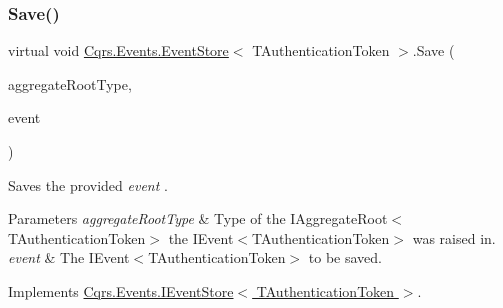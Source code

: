 \mbox{\label{classCqrs_1_1Events_1_1EventStore_a3ba5ba04a36382b6d36a6ad8867dc766_a3ba5ba04a36382b6d36a6ad8867dc766}} 
\subsubsection{\texorpdfstring{Save()}{Save()}}
{\footnotesize\ttfamily virtual void \hyperlink{classCqrs_1_1Events_1_1EventStore}{Cqrs.\+Events.\+Event\+Store}$<$ T\+Authentication\+Token $>$.Save (\begin{DoxyParamCaption}\item[{Type}]{aggregate\+Root\+Type,  }\item[{\hyperlink{interfaceCqrs_1_1Events_1_1IEvent}{I\+Event}$<$ T\+Authentication\+Token $>$ @}]{event }\end{DoxyParamCaption})\hspace{0.3cm}{\ttfamily [virtual]}}



Saves the provided {\itshape event} . 


\begin{DoxyParams}{Parameters}
{\em aggregate\+Root\+Type} & Type of the I\+Aggregate\+Root$<$\+T\+Authentication\+Token$>$ the I\+Event$<$\+T\+Authentication\+Token$>$ was raised in.\\
\hline
{\em event} & The I\+Event$<$\+T\+Authentication\+Token$>$ to be saved.\\
\hline
\end{DoxyParams}


Implements \hyperlink{interfaceCqrs_1_1Events_1_1IEventStore_a81fb586703e7c6dea6b23d9a95f3887a_a81fb586703e7c6dea6b23d9a95f3887a}{Cqrs.\+Events.\+I\+Event\+Store$<$ T\+Authentication\+Token $>$}.

\mbox{\label{classCqrs_1_1Events_1_1EventStore_a958854f49c3eb4fcf1922ba7737a8dfe_a958854f49c3eb4fcf1922ba7737a8dfe}} 
